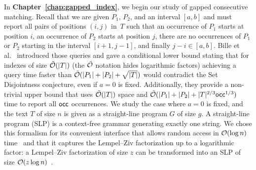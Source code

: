 In \textbf{Chapter~\ref{chap:gapped_index}}, we begin our study of gapped consecutive matching. Recall that we are given $P_1$, $P_2$, and an interval $[a,b]$ and must report all pairs of positions $(i,j)$ in~$T$ such that an occurrence of $P_1$ starts at position $i$, an occurrence of $P_2$ starts at position $j$, there are no occurrences of $P_1$ or $P_2$ starting in the interval $[i+1,j-1]$, and finally $j-i \in [a,b]$.
Bille et al.~\cite{bille2022gapped} introduced those queries and gave a conditional lower bound stating that for indexes of size $\tilde {\mathcal{O}}(|T|)$ (the $\tilde {\mathcal{O}}$ notation hides logarithmic factors) achieving a query time faster than $\tilde {\mathcal{O}}(|P_1|+|P_2|+\sqrt{|T|})$ would contradict the Set Disjointness conjecture, even if $a=0$ is fixed. Additionally, they provide a non-trivial upper bound that uses $\tilde {\mathcal{O}}(|T|)$ space and $\tilde {\mathcal{O}} (|P_1| +|P_2| + |T|^{2/3}\mathsf{occ}^{1/3})$ time to report all $\mathsf{occ}$ occurrences. 
We study the case where $a=0$ is fixed, and the text $T$ of size $n$ is given as a straight-line program $G$ of size $g$. A straight-line program (SLP) is a context-free grammar generating exactly one string. We chose this formalism for its convenient interface that allows random access in $\mathcal{O}(\log n)$ time~\cite{random_access_grammar_compress} and that it captures the  Lempel--Ziv factorization up to a logarithmic factor: a Lempel--Ziv factorization of size $z$ can be transformed into an SLP of size $\mathcal{O}(z\log n)$~\cite{CharikarLLPPRSS02,Rytter02}.

